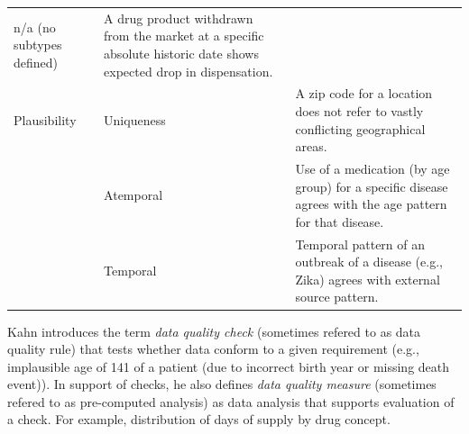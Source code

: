 \documentclass[]{book}
\begin{document}
\begin{longtable}[]{@{}lll@{}}
\begin{minipage}[t]{0.16\columnwidth}
n/a (no subtypes defined)\strut
\end{minipage} & \begin{minipage}[t]{0.67\columnwidth}\raggedright\strut
A drug product withdrawn from the market at a specific absolute historic
date shows expected drop in dispensation.\strut
\end{minipage}\tabularnewline
\begin{minipage}[t]{0.09\columnwidth}\raggedright\strut
Plausibility\strut
\end{minipage} & \begin{minipage}[t]{0.16\columnwidth}\raggedright\strut
Uniqueness\strut
\end{minipage} & \begin{minipage}[t]{0.67\columnwidth}\raggedright\strut
A zip code for a location does not refer to vastly conflicting
geographical areas.\strut
\end{minipage}\tabularnewline
\begin{minipage}[t]{0.09\columnwidth}\raggedright\strut
\strut
\end{minipage} & \begin{minipage}[t]{0.16\columnwidth}\raggedright\strut
Atemporal\strut
\end{minipage} & \begin{minipage}[t]{0.67\columnwidth}\raggedright\strut
Use of a medication (by age group) for a specific disease agrees with
the age pattern for that disease.\strut
\end{minipage}\tabularnewline
\begin{minipage}[t]{0.09\columnwidth}\raggedright\strut
\strut
\end{minipage} & \begin{minipage}[t]{0.16\columnwidth}\raggedright\strut
Temporal\strut
\end{minipage} & \begin{minipage}[t]{0.67\columnwidth}\raggedright\strut
Temporal pattern of an outbreak of a disease (e.g., Zika) agrees with
external source pattern.\strut
\end{minipage}\tabularnewline
\bottomrule
\end{longtable}

Kahn introduces the term \emph{data quality check} (sometimes refered to
as data quality rule) that tests whether data conform to a given
requirement (e.g., implausible age of 141 of a patient (due to incorrect
birth year or missing death event)). In support of checks, he also
defines \emph{data quality measure} (sometimes refered to as
pre-computed analysis) as data analysis that supports evaluation of a
check. For example, distribution of days of supply by drug concept.
\end{document}
